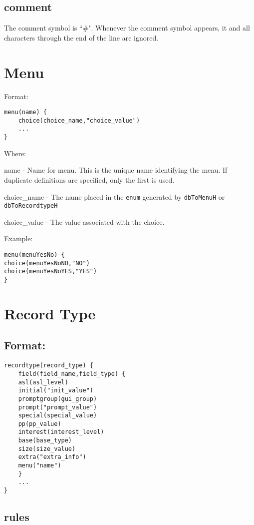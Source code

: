 \subsection{comment}

The comment symbol is ``\#". Whenever the comment symbol appears, it and all characters through the end of the line are 
ignored.

\section{Menu}

Format:

\begin{verbatim}menu(name) {
    choice(choice_name,"choice_value")
    ...
}
\end{verbatim}Where:

\begin{description}\item name - Name for menu. This is the unique name identifying the menu. If duplicate definitions are specified, only 
the first is used.

\item choice\_name - The name placed in the \verb|enum| generated by \verb|dbToMenuH| or \verb|dbToRecordtypeH|

\item choice\_value - The value associated with the choice.

\end{description}Example:

\begin{verbatim}menu(menuYesNo) {
choice(menuYesNoNO,"NO")
choice(menuYesNoYES,"YES")
}
\end{verbatim}\section{Record Type}

\subsection{Format:}

\begin{verbatim}
recordtype(record_type) {
    field(field_name,field_type) {
    asl(asl_level)
    initial("init_value")
    promptgroup(gui_group)
    prompt("prompt_value")
    special(special_value)
    pp(pp_value)
    interest(interest_level)
    base(base_type)
    size(size_value)
    extra("extra_info")
    menu("name")
    }
    ...
}
\end{verbatim}\subsection{rules}

